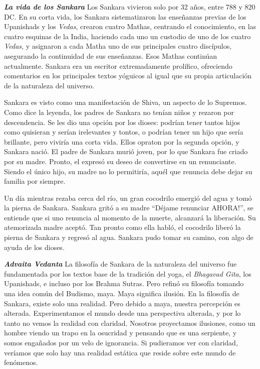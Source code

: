 \textbf{\textit{La vida de los Sankara}}
Los Sankara vivieron solo por 32 años, entre 788 y 820 DC. En su corta vida, los Sankara sistematizaron las enseñanzas previas de los Upanishads y los \textit{Vedas}, crearon cuatro Mathas, centrando el conocimiento, en las cuatro esquinas de la India, haciendo cada uno un custodio de uno de los cuatro \textit{Vedas}, y asignaron a cada Matha uno de sus principales cuatro discípulos, asegurando la continuidad de sus enseñanzas. Esos Mathas continúan actualmente. Sankara era un escritor extremadamente prolífico, ofreciendo comentarios en los principales textos yóguicos al igual que su propia articulación de la naturaleza del universo.

Sankara es visto como una manifestación de Shiva, un aspecto de lo Supremos. Como dice la leyenda, los padres de Sankara no tenían niños y rezaron por descendencia. Se les dio una opción por los dioses: podrían tener tantos hijos como quisieran y serían irelevantes y tontos, o podrían tener un hijo que sería brillante, pero viviría una corta vida. Ellos opraton por la segunda opción, y Sankara nació. El padre de Sankara murió joven, por lo que Sankara fue criado por su madre. Pronto, el expresó su deseo de convertirse en un renunciante. Siendo el único hijo, su madre no lo permitiría, aqu\'el que renuncia debe dejar su familia por siempre.

Un día mientras rezaba cerca del río, un gran cocodrilo emergió del agua y tomó la pierna de Sankara. Sankara gritó a su madre ``D\'ejame renunciar AHORA!'', se entiende que si uno renuncia al momento de la muerte, alcanzará la liberación. Su atemorizada madre aceptó. Tan pronto como ella habló, el cocodrilo liberó la pierna de Sankara y regresó al agua. Sankara pudo tomar su camino, con algo de ayuda de los dioses.

\textbf{\textit{Advaita Vedanta}}
La filosofía de Sankara de la naturaleza del universo fue fundamentada por los textos base de la tradición del yoga, el \textit{Bhagavad Gita}, los Upanishads, e incluso por los Brahma Sutras. Pero refinó su filosofía tomando una idea común del Budismo, maya. Maya significa ilusión. En la filosofía de Sankara, existe solo una realidad. Pero debido a maya, nuestra percepción es alterada. Experimentamos el mundo desde una perspectiva alterada, y por lo tanto no vemos la realidad con claridad. Nosotros proyectamos ilusiones, como un hombre viendo un trapo en la osucridad y pensando que es una serpiente, y somos engañados por un velo de ignorancia. Si pudieramos ver con claridad, veríamos que solo hay una realidad estática que reside sobre este mundo de fenómenos.

